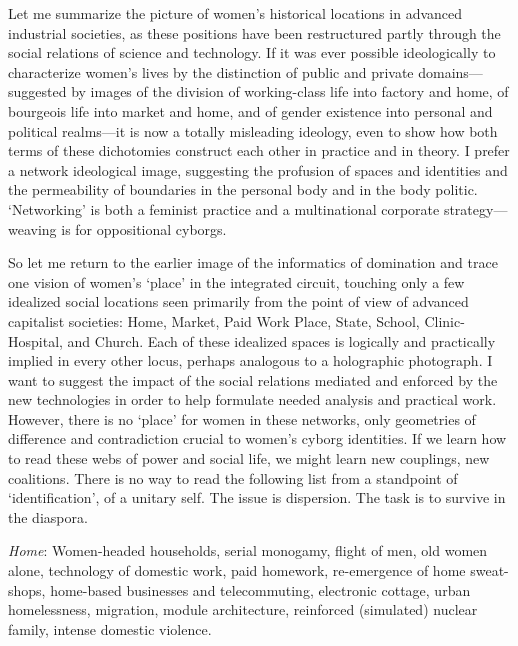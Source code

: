 \documentclass[DIV=12,%
               BCOR=10mm,%
               headinclude=false,%
               footinclude=false,open=any,%
               fontsize=11pt,%
               twoside,%
               paper=210mm:11in]%
               {scrbook}
\newcommand*{\hairline}{%
  \bigskip%
  \noindent \hrulefill%
  \bigskip%
}
\begin{document}
Let me summarize the picture of women’s historical locations in advanced industrial societies, as these positions have been restructured partly through the social relations of science and technology. If it was ever possible ideologically to characterize women’s lives by the distinction of public and private domains—suggested by images of the division of working-class life into factory and home, of bourgeois life into market and home, and of gender existence into personal and political realms—it is now a totally misleading ideology, even to show how both terms of these dichotomies construct each other in practice and in theory. I prefer a network ideological image, suggesting the profusion of spaces and identities and the permeability of boundaries in the personal body and in the body politic. ‘Networking’ is both a feminist practice and a multinational corporate strategy—weaving is for oppositional cyborgs.


So let me return to the earlier image of the informatics of domination and trace one vision of women’s ‘place’ in the integrated circuit, touching only a few idealized social locations seen primarily from the point of view of advanced capitalist societies: Home, Market, Paid Work Place, State, School, Clinic-Hospital, and Church. Each of these idealized spaces is logically and practically implied in every other locus, perhaps analogous to a holographic photograph. I want to suggest the impact of the social relations mediated and enforced by the new technologies in order to help formulate needed analysis and practical work. However, there is no ‘place’ for women in these networks, only geometries of difference and contradiction crucial to women’s cyborg identities. If we learn how to read these webs of power and social life, we might learn new couplings, new coalitions. There is no way to read the following list from a standpoint of ‘identification’, of a unitary self. The issue is dispersion. The task is to survive in the diaspora.


\hairline


\emph{Home}: Women-headed households, serial monogamy, flight of men, old women alone, technology of domestic work, paid homework, re-emergence of home sweat-shops, home-based businesses and telecommuting, electronic cottage, urban homelessness, migration, module architecture, reinforced (simulated) nuclear family, intense domestic violence.
\end{document}
